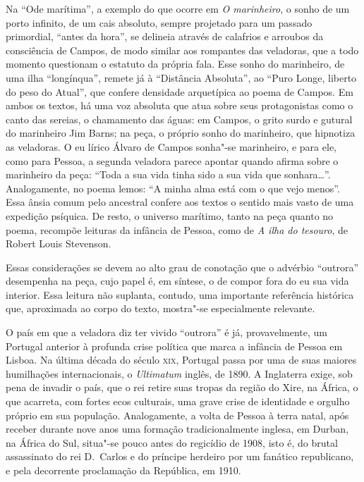 Na “Ode marítima”, a exemplo do que ocorre em
\textit{O marinheiro}, o
sonho de um porto infinito, de um cais
absoluto, sempre projetado para
um passado primordial, “antes da hora”, se delineia através de
calafrios e arroubos da consciência de Campos, de modo similar aos
rompantes das veladoras, que a todo momento
questionam o estatuto da
própria fala. Esse sonho do marinheiro,
de uma ilha “longínqua”, remete
já à “Distância Absoluta”, ao “Puro Longe,
liberto do peso do Atual”,
que confere densidade arquetípica ao poema de Campos. Em ambos os
textos, há uma voz absoluta que atua sobre
seus protagonistas como o
canto das sereias, o chamamento das águas:
em Campos, o grito surdo e
gutural do marinheiro Jim Barns; na peça, o próprio sonho do
marinheiro, que hipnotiza as veladoras. O eu lírico
Álvaro de Campos sonha"-se marinheiro, e
para ele, como para Pessoa, a
segunda veladora parece apontar
quando afirma sobre o marinheiro da
peça: “Toda a sua vida tinha sido a sua vida que sonhara\ldots{}”.
Analogamente, no poema lemos: 
“A minha alma está com o que vejo menos”.
Essa ânsia comum pelo ancestral 
confere aos textos o sentido mais vasto
de uma expedição psíquica. De resto, 
o universo marítimo, tanto na peça
quanto no poema, recompõe leituras da infância de Pessoa, como de
\textit{A ilha do tesouro}, de Robert Louis Stevenson.


Essas considerações se devem ao alto grau
de conotação que o advérbio
“outrora” desempenha na peça,
cujo papel é, em síntese, o de compor
fora do eu sua vida interior.
Essa leitura não suplanta, contudo, uma
importante referência histórica que,
aproximada ao corpo do texto,
mostra"-se especialmente relevante. 

O país em que a veladora diz ter vivido “outrora” é
já, provavelmente, um Portugal anterior à profunda
crise política que
marca a infância de Pessoa em Lisboa.
Na última década do século \textsc{xix},
Portugal passa por uma de suas maiores
humilhações internacionais, o
\textit{Ultimatum} inglês, de 1890.
A Inglaterra exige, sob pena de
invadir o país, que o rei retire suas tropas 
da região do Xire, na
África, o que acarreta, com fortes ecos 
culturais, uma grave crise de
identidade e orgulho próprio em sua população.
Analogamente, a volta de
Pessoa à terra natal, após receber durante nove anos uma formação
tradicionalmente inglesa, em Durban, 
na África do Sul, situa"-se pouco
antes do regicídio de 1908, isto é, 
do brutal assassinato do rei D.~Carlos
e do príncipe herdeiro por um fanático republicano, e pela
decorrente proclamação da República, em 1910. 

